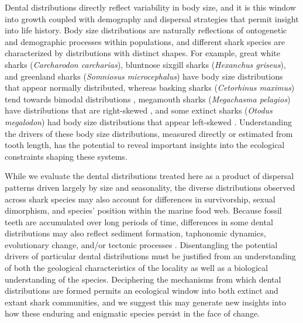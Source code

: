 \documentclass[]{rsos}%
\begin{document}
Dental distributions directly reflect variability in body size, and it is this window into growth coupled with demography and dispersal strategies that permit insight into life history.
Body size distributions are naturally reflections of ontogenetic and demographic processes within populations, and different shark species are characterized by distributions with distinct shapes.
For example, great white sharks (\emph{Carcharodon carcharias}), bluntnose sixgill sharks (\emph{Hexanchus griseus}), and greenland sharks (\emph{Somniosus microcephalus}) have body size distributions that appear normally distributed, whereas basking sharks (\emph{Cetorhinus maximus}) tend towards bimodal distributions \cite{mcclain2015sizing}, megamouth sharks (\emph{Megachasma pelagios}) have distributions that are right-skewed \cite{watanabe2019distribution}, and some extinct sharks (\emph{Otodus megalodon}) had  body size distributions that appear left-skewed \cite{pimiento2015body}.
Understanding the drivers of these body size distributions, measured directly or estimated from tooth length, has the potential to reveal important insights into the ecological constraints shaping these systems.

While we evaluate the dental distributions treated here as a product of dispersal patterns driven largely by size and seasonality, the diverse distributions observed across shark species may also account for differences in survivorship, sexual dimorphism, and species' position within the marine food web.
Because fossil teeth are accumulated over long periods of time, differences in some dental distributions may also reflect sediment formation, taphonomic dynamics, evolutionary change, and/or tectonic processes \cite{shimada2005types, Whitenack}. 
Disentangling the potential drivers of particular dental distributions must be justified from an understanding of both the geological characteristics of the locality as well as a biological understanding of the species.
Deciphering the mechanisms from which  dental distributions are formed permits an ecological window into both extinct and extant shark communities, and we suggest this may generate new insights into how these enduring and enigmatic species persist in the face of change.



\end{document}
